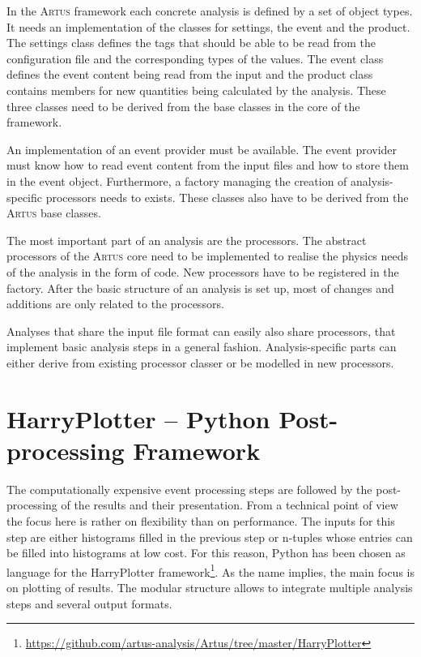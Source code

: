\documentclass[3p]{elsarticle}
\newcommand{\software}[1]{\textsc{#1}\xspace}
\newcommand{\artus}{\software{Artus}}
\begin{document}
In the \artus framework each concrete analysis is defined by a set of object types. It needs an implementation of the classes for settings, the event and the product. The settings class defines the tags that should be able to be read from the configuration file and the corresponding types of the values. The event class defines the event content being read from the input and the product class contains members for new quantities being calculated by the analysis. These three classes need to be derived from the base classes in the core of the framework.

An implementation of an event provider must be available. The event provider must know how to read event content from the input files and how to store them in the event object. Furthermore, a factory managing the creation of analysis-specific processors needs to exists. These classes also have to be derived from the \artus base classes.

The most important part of an analysis are the processors. The abstract processors of the \artus core need to be implemented to realise the physics needs of the analysis in the form of code. New processors have to be registered in the factory. After the basic structure of an analysis is set up, most of changes and additions are only related to the processors.

Analyses that share the input file format can easily also share processors, that implement basic analysis steps in a general fashion. Analysis-specific parts can either derive from existing processor classer or be modelled in new processors.


\section{HarryPlotter -- Python Post-processing Framework \label{section_artus_harryplotter}}

The computationally expensive event processing steps are followed by the post-processing of the results and their presentation. From a technical point of view the focus here is rather on flexibility than on performance. The inputs for this step are either histograms filled in the previous step or n-tuples whose entries can be filled into histograms at low cost. For this reason, Python has been chosen as language for the HarryPlotter framework\footnote{\url{https://github.com/artus-analysis/Artus/tree/master/HarryPlotter}}. As the name implies, the main focus is on plotting of results. The modular structure allows to integrate multiple analysis steps and several output formats.
\end{document}
